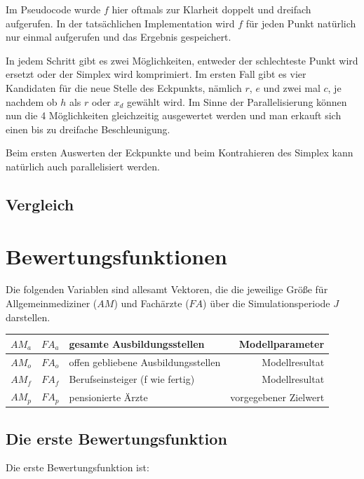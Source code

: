 \documentclass[a4paper,12pt]{article}
\begin{document}
Im Pseudocode wurde $f$ hier oftmals zur Klarheit doppelt und dreifach aufgerufen. In der tatsächlichen Implementation wird $f$ für jeden Punkt natürlich nur einmal aufgerufen und das Ergebnis gespeichert.

In jedem Schritt gibt es zwei Möglichkeiten, entweder der schlechteste Punkt wird ersetzt oder der Simplex wird komprimiert. Im ersten Fall gibt es vier Kandidaten für die neue Stelle des Eckpunkts, nämlich $r$, $e$ und zwei mal $c$, je nachdem ob $h$ als $r$ oder $x_d$ gewählt wird. Im Sinne der Parallelisierung können nun die 4 Möglichkeiten gleichzeitig ausgewertet werden und man erkauft sich einen bis zu dreifache Beschleunigung. 

Beim ersten Auswerten der Eckpunkte und beim Kontrahieren des Simplex kann natürlich auch parallelisiert werden. 


\subsection{Vergleich}

\newpage

\section{Bewertungsfunktionen}

Die folgenden Variablen sind allesamt Vektoren, die die jeweilige Größe für Allgemeinmediziner ($AM$) und Fachärzte ($FA$) über die Simulationsperiode $J$ darstellen.

\begin{center}
\begin{tabular}{ | c | c | l | r |}
\hline
$AM_a$ & $FA_a$ & gesamte Ausbildungsstellen & Modellparameter \\ \hline
$AM_o$ & $FA_o$ & offen gebliebene Ausbildungsstellen & Modellresultat \\ \hline
$AM_f$ & $FA_f$ & Berufseinsteiger (f wie fertig) & Modellresultat \\ \hline
$AM_p$ & $FA_p$ & pensionierte Ärzte & vorgegebener Zielwert \\ \hline
\end{tabular}
\end{center}

\subsection{Die erste Bewertungsfunktion}

Die erste Bewertungsfunktion ist:
\end{document}
